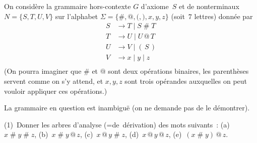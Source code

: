 \documentclass[12pt,a4paper]{article}
\theoremstyle{definition}
\begin{document}
On considère la grammaire hors-contexte $G$ d'axiome $S$ et de
nonterminaux $N = \{S, T, U, V\}$ sur l'alphabet $\Sigma =
\{{\#},{@},{(},{)}, x, y, z\}$ (soit $7$ lettres) donnée par
\[
\begin{aligned}
S &\rightarrow T \;|\; S\mathbin{\#}T\\
T &\rightarrow U \;|\; U\mathbin{@}T\\
U &\rightarrow V \;|\; (\,S\,)\\
V &\rightarrow x \;|\; y \;|\; z\\
\end{aligned}
\]
(On pourra imaginer que $\#$ et $@$ sont deux opérations binaires, les
parenthèses servent comme on s'y attend, et $x,y,z$ sont trois opérandes
auxquelles on peut vouloir appliquer ces opérations.)

La grammaire en question est inambiguë (on ne demande pas de le
démontrer).

(1) Donner les arbres d'analyse (=de dérivation) des mots suivants :
(a) $x\mathbin{\#}y\mathbin{\#}z$, (b) $x\mathbin{\#}y\mathbin{@}z$,
(c) $x\mathbin{@}y\mathbin{\#}z$, (d) $x\mathbin{@}y\mathbin{@}z$,
(e) $(x\mathbin{\#}y)\mathbin{@}z$.
\end{document}
